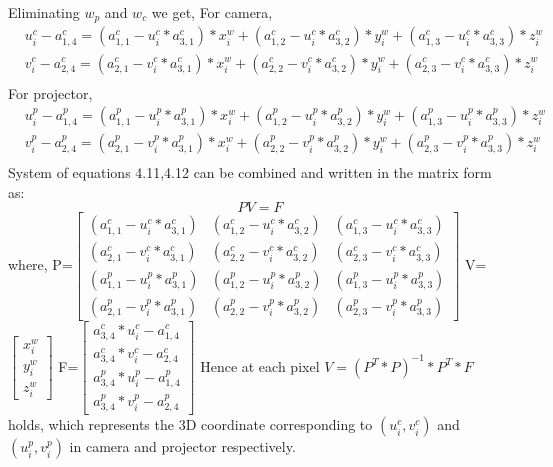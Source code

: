 \noindent
Eliminating $w_p$ and $w_c$ we get,\newline
\noindent
For camera,
\begin{equation}
\begin{aligned}
& u_i^c-a_{1,4}^c=(a_{1,1}^c-u_i^c*a_{3,1}^c)*x_i^w+(a_{1,2}^c-u_i^c*a_{3,2}^c)*y_i^w+(a_{1,3}^c-u_i^c*a_{3,3}^c)*z_i^w \\
& v_i^c-a_{2,4}^c=(a_{2,1}^c-v_i^c*a_{3,1}^c)*x_i^w
+(a_{2,2}^c-v_i^c*a_{3,2}^c)*y_i^w+(a_{2,3}^c-v_i^c*a_{3,3}^c)*z_i^w \\
\end{aligned}
\end{equation}
For projector,
\begin{equation}
\begin{aligned}
& u_i^p-a_{1,4}^p=(a_{1,1}^p-u_i^p*a_{3,1}^p)*x_i^w+(a_{1,2}^p-u_i^p*a_{3,2}^p)*y_i^w+(a_{1,3}^p-u_i^p*a_{3,3}^p)*z_i^w \\
& v_i^p-a_{2,4}^p=(a_{2,1}^p-v_i^p*a_{3,1}^p)*x_i^w
+(a_{2,2}^p-v_i^p*a_{3,2}^p)*y_i^w+(a_{2,3}^p-v_i^p*a_{3,3}^p)*z_i^w \\
\end{aligned}
\end{equation}\newline
\noindent
System of equations 4.11,4.12 can be combined and written in the matrix form as:
\begin{equation}
PV=F
\end{equation}
\noindent
where,\newline
\newline
P=$\begin{bmatrix}
(a_{1,1}^c-u_i^c*a_{3,1}^c) & (a_{1,2}^c-u_i^c*a_{3,2}^c) & (a_{1,3}^c-u_i^c*a_{3,3}^c) \\ (a_{2,1}^c-v_i^c*a_{3,1}^c) & (a_{2,2}^c-v_i^c*a_{3,2}^c) & (a_{2,3}^c-v_i^c*a_{3,3}^c) \\
(a_{1,1}^p-u_i^p*a_{3,1}^p) & (a_{1,2}^p-u_i^p*a_{3,2}^p) & (a_{1,3}^p-u_i^p*a_{3,3}^p) \\ (a_{2,1}^p-v_i^p*a_{3,1}^p) & (a_{2,2}^p-v_i^p*a_{3,2}^p) & (a_{2,3}^p-v_i^p*a_{3,3}^p)
\end{bmatrix}$\newline 
\newline
\newline
\noindent
V=$\begin{bmatrix}
x_i^w\\
y_i^w\\
z_i^w
\end{bmatrix}$\newline 
\newline
\newline
\noindent
F=$\begin{bmatrix}
a_{3,4}^c*u_i^c-a_{1,4}^c\\
a_{3,4}^c*v_i^c-a_{2,4}^c\\
a_{3,4}^p*u_i^p-a_{1,4}^p\\
a_{3,4}^p*v_i^p-a_{2,4}^p
\end{bmatrix}$\newline
\noindent
\newline
Hence at each pixel $V=(P^T*P)^{-1}*P^T*F$ holds, which represents the 3D coordinate corresponding to $(u_i^c,v_i^c)$ and $ (u_i^p,v_i^p)$ in camera and projector respectively.

